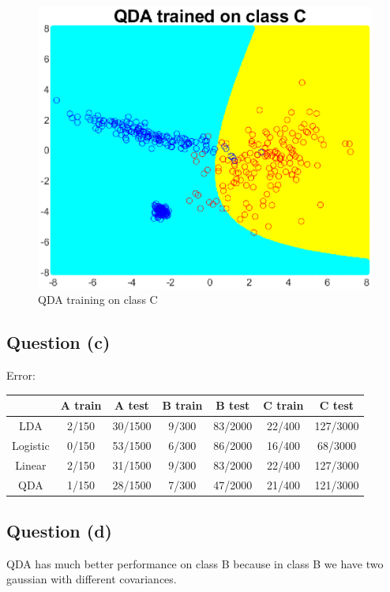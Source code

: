 \documentclass{article}
\begin{document}
	\begin{figure}
		\centering
		\includegraphics[scale=0.6]{qda_c.eps}
		\caption{QDA training on class C}
		\label{fig:qda_c}
	\end{figure}
	\subsection{Question (c)}
	Error:
	\begin{center}
		\begin{tabular}{ c | c | c | c | c | c | c }
			\hline
			& A train & A test & B train & B test & C train & C test \\ \hline
			LDA & 2/150 & 30/1500 & 9/300 & 83/2000 & 22/400 & 127/3000 \\ \hline
			Logistic & 0/150 & 53/1500 & 6/300 & 86/2000 & 16/400 & 68/3000  \\ \hline
			Linear & 2/150 & 31/1500 & 9/300 & 83/2000 & 22/400 & 127/3000  \\ \hline
			QDA & 1/150 & 28/1500 & 7/300 & 47/2000 & 21/400 & 121/3000 \\ \hline
		\end{tabular}
	\end{center}

	\subsection{Question (d)}
	QDA has much better performance on class B because in class B we have two gaussian with different covariances.
\end{document}
